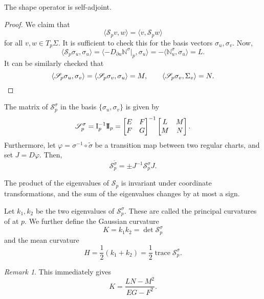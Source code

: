 \documentclass[11pt]{article}
\newcommand{\N}{\mathbb{N}}
\newcommand{\I}{{\rm I}}
\newcommand{\II}{{\rm I\!I}}
\newcommand{\ip}[2]{\langle #1, #2 \rangle}
\DeclareMathOperator{\trace}{trace}
\theoremstyle{definition}
\theoremstyle{remark}
\newtheorem*{remark}{Remark}
\numberwithin{equation}{section}
\begin{document}
    \begin{lemma}
        The shape operator is self-adjoint.
    \end{lemma}
    \begin{proof}
        We claim that \[
            \ip{\mathscr{S}_p v}{w} = \ip{v}{\mathscr{S}_p w}
        \] for all $v, w \in T_p\Sigma$. It is sufficient to check this for the basis
        vectors $\sigma_u, \sigma_v$. Now, \[
            \ip{\mathscr{S}_p\sigma_u}{\sigma_u} = \ip{-D_{\partial
            u}\N^{\sigma}\big|_{p}}{\sigma_u} = -\ip{\N^\sigma_u}{\sigma_u} = L.
        \] It can be similarly checked that \[
            \ip{\mathscr{S}_p\sigma_u}{\sigma_v} =
            \ip{\mathscr{S}_p\sigma_v}{\sigma_u} = M, \qquad
            \ip{\mathscr{S}_p\sigma_v}{\Sigma_v} = N. \qedhere
        \] 
    \end{proof}

    \begin{lemma}
        The matrix of $\mathscr{S}_p^\sigma$ in the basis $\{\sigma_u, \sigma_v\}$ is
        given by \[
            \mathscr{S}_p^\sigma = \I_p^{-1}\II_p = \begin{bmatrix}
                E & F \\ F & G
            \end{bmatrix}^{-1} \begin{bmatrix}
                L & M \\ M & N
            \end{bmatrix}.
        \] Furthermore, let $\varphi = \sigma^{-1}\circ \tilde{\sigma}$ be a
        transition map between two regular charts, and set $J = D\varphi$. Then, \[
            \mathscr{S}_p^{\tilde{\sigma}} = \pm J^{-1}\mathscr{S}_p^\sigma J.
        \] 
    \end{lemma}

    \begin{corollary}
        The product of the eigenvalues of $\mathscr{S}_p$ is invariant under
        coordinate transformations, and the sum of the eigenvalues changes by at most
        a sign.
    \end{corollary}

    \begin{definition}
        Let $k_1, k_2$ be the two eigenvalues of $\mathscr{S}_p^\sigma$. These are
        called the principal curvatures of at $p$. We further define the Gaussian
        curvature \[
            K = k_1k_2 = \det{\mathscr{S}_p^\sigma}
        \] and the mean curvature \[
            H = \frac{1}{2}(k_1 + k_2) = \frac{1}{2}\trace{\mathscr{S}_p^\sigma}.
        \] 
        \begin{remark}
            This immediately gives \[
                K = \frac{LN - M^2}{EG - F^2}.
            \] 
        \end{remark}
    \end{definition}
\end{document}
